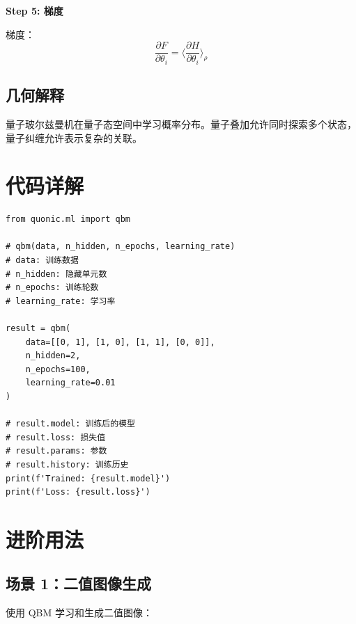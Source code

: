 \documentclass[12pt,a4paper]{article}
\begin{document}
\textbf{Step 5: 梯度}

梯度：
\begin{equation}
\frac{\partial F}{\partial \theta_i} = \langle\frac{\partial H}{\partial \theta_i}\rangle_\rho
\end{equation}

\subsection{几何解释}

量子玻尔兹曼机在量子态空间中学习概率分布。量子叠加允许同时探索多个状态，量子纠缠允许表示复杂的关联。

\section{代码详解}

\begin{verbatim}
from quonic.ml import qbm

# qbm(data, n_hidden, n_epochs, learning_rate)
# data: 训练数据
# n_hidden: 隐藏单元数
# n_epochs: 训练轮数
# learning_rate: 学习率

result = qbm(
    data=[[0, 1], [1, 0], [1, 1], [0, 0]],
    n_hidden=2,
    n_epochs=100,
    learning_rate=0.01
)

# result.model: 训练后的模型
# result.loss: 损失值
# result.params: 参数
# result.history: 训练历史
print(f'Trained: {result.model}')
print(f'Loss: {result.loss}')
\end{verbatim}

\section{进阶用法}

\subsection{场景 1：二值图像生成}

使用 QBM 学习和生成二值图像：
\end{document}
